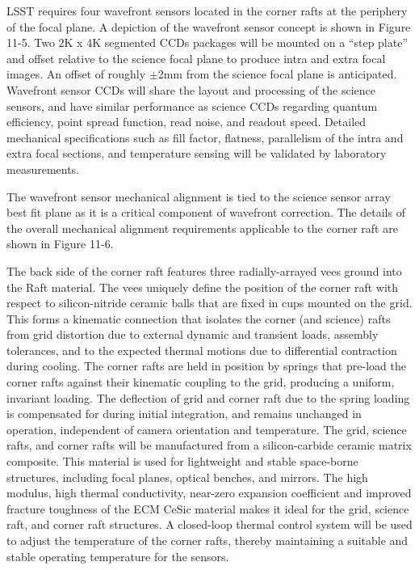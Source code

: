LSST requires four wavefront sensors located in the corner rafts at the periphery of the focal plane. A
depiction of the wavefront sensor concept is shown in Figure 11-5. Two 2K x 4K segmented CCDs
packages will be mounted on a “step plate” and offset relative to the science focal plane to produce
intra and extra focal images. An offset of roughly $\pm$2mm from the science focal plane is anticipated.
Wavefront sensor CCDs will share the layout and processing of the science sensors, and have similar
performance as science CCDs regarding quantum efficiency, point spread function, read noise, and
readout speed. Detailed mechanical specifications such as fill factor, flatness, parallelism of the intra
and extra focal sections, and temperature sensing will be validated by laboratory measurements.

The wavefront sensor mechanical alignment is tied to the science sensor array best fit plane as it is a
critical component of wavefront correction. The details of the overall mechanical alignment
requirements applicable to the corner raft are shown in Figure 11-6.

The back side of the corner raft features three radially-arrayed vees ground into the Raft material. The
vees uniquely define the position of the corner raft with respect to silicon-nitride ceramic balls that are
fixed in cups mounted on the grid. This forms a kinematic connection that isolates the corner (and
science) rafts from grid distortion due to external dynamic and transient loads, assembly tolerances, and
to the expected thermal motions due to differential contraction during cooling. The corner rafts are
held in position by springs that pre-load the corner rafts against their kinematic coupling to the grid,
producing a uniform, invariant loading. The deflection of grid and corner raft due to the spring loading is
compensated for during initial integration, and remains unchanged in operation, independent of camera
orientation and temperature.
The grid, science rafts, and corner rafts will be manufactured from a silicon-carbide ceramic matrix
composite. This material is used for lightweight and stable space-borne structures, including focal
planes, optical benches, and mirrors. The high modulus, high thermal conductivity, near-zero expansion
coefficient and improved fracture toughness of the ECM CeSic material makes it ideal for the grid,
science raft, and corner raft structures. A closed-loop thermal control system will be used to adjust the
temperature of the corner rafts, thereby maintaining a suitable and stable operating temperature for
the sensors.


